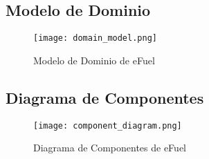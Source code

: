 \subsection{Modelo de Dominio}
\begin{figure}[H]
    \texttt{[image: domain\_model.png]}
    \caption{Modelo de Dominio de eFuel}
    \label{fig:domain_model}
    \centering
\end{figure}

\subsection{Diagrama de Componentes}
\begin{figure}[H]
    \texttt{[image: component\_diagram.png]}
    \caption{Diagrama de Componentes de eFuel}
    \label{fig:domain_model}
    \centering
\end{figure}